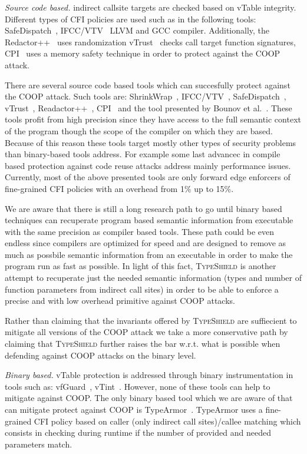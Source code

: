 \textit{Source code based.} indirect callsite targets are checked based on vTable integrity.
Different types of CFI policies are used such as in the following tools:
SafeDispatch~\cite{safedispatch:jang}, IFCC/VTV~\cite{vtv:tice} LLVM and GCC compiler.
Additionally, the Redactor++~\cite{crane:readactor++} uses randomization 
vTrust~\cite{zhang:vtrust} checks call target function signatures, 
CPI~\cite{volodymyr:cpi} uses a memory safety technique
in order to protect against the COOP attack.

There are several source code based tools 
which can succesfully protect against the COOP attack.
Such tools are: ShrinkWrap~\cite{haller:shrinkwrap}, IFCC/VTV~\cite{vtv:tice}, 
SafeDispatch~\cite{safedispatch:jang}, vTrust~\cite{zhang:vtrust}, Readactor++~\cite{crane:readactor++}, CPI~\cite{volodymyr:cpi} and the
tool presented by Bounov et al.~\cite{bounov:interleaving}. These tools profit from high precision
since they have access to the full semantic context of the program though the scope
of the compiler on which they are based. 
Because of this reason these tools target mostly other types of security problems than binary-based 
tools address. For example some last advancec in compile based protection against 
code reuse attacks address mainly performance issues.
Currently, most of the above presented tools are only forward
edge enforcers of fine-grained CFI policies with an overhead from 1\% up to 15\%.

We are aware that there is still a long research path to go until binary based techniques can 
recuperate program based semantic information from executable with the same precision as compiler based tools.
These path could be even endless since compilers are optimized for speed and are designed to remove as much as possbile semantic information
from an executable in order to make the program run as fast as possible. In light of this fact,
\textsc{TypeShield} is another attempt to recuperate just the needed semantic information (types and number of function parameters from
indirect call sites) in order to be able to enforce a precise and with low overhead primitive against COOP attacks.

Rather than claiming that the invariants offered by \textsc{TypeShield} are suffiecient
to mitigate all versions of the COOP attack we take a more conservative path by claiming that \textsc{TypeShield} 
further raises the bar w.r.t. what is possible when defending against COOP attacks on the binary level.

\textit{Binary based.} vTable protection is addressed through binary instrumentation in tools
such as: vfGuard~\cite{vfuard:aravind}, vTint~\cite{vtint:zhang}. However, none of these tools can
help to mitigate against COOP. The only binary based tool which we are aware of that
can mitigate protect against COOP is TypeArmor~\cite{veen:typearmor}.  
TypeArmor uses a fine-grained CFI policy based on caller (only indirect call sites)/callee matching 
which consists in checking during runtime if the number of provided and needed parameters match.


